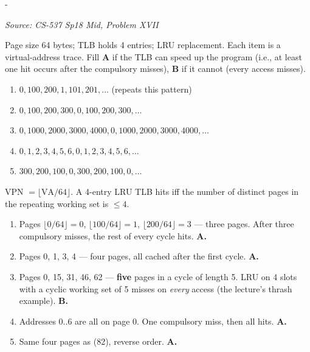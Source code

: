 \documentclass[11pt,a4paper]{article}
\makeatletter
\newcommand{\keepspace}[1]{\par\penalty-100\begingroup
  \setlength{\dimen@}{#1}\dimen@ii\pagegoal\advance\dimen@ii-\pagetotal
  \ifdim\dimen@>\dimen@ii\ifdim\dimen@ii>\z@\vfil\fi\break\fi\endgroup}
\newcounter{qn}[section]
\newenvironment{Qn}[4]{%
  \refstepcounter{qn}\keepspace{7\baselineskip}%
  \begin{tcolorbox}[qboxstyle, title={Q\thesection.\theqn\ \ [#1 \textbar\ #2]\ \ #4}]%
  {\footnotesize\color{g3}\textit{Source: #3}}\par\smallskip%
}{%
  \end{tcolorbox}%
}
\newenvironment{Sol}{%
  \begin{tcolorbox}[sboxstyle, title={Solution}]%
}{%
  \end{tcolorbox}\vspace{0.35em}%
}
\makeatother
\begin{document}
\begin{Qn}{Easy-Medium}{Lect 13}{CS-537 Sp18 Mid, Problem XVII}{Does a 4-entry LRU TLB help this address trace?}
Page size 64 bytes; TLB holds 4 entries; LRU replacement. Each item is a
virtual-address trace. Fill \textbf{A} if the TLB can speed up the
program (i.e., at least one hit occurs after the compulsory misses),
\textbf{B} if it cannot (every access misses).
\begin{enumerate}[(81)]
\item $0, 100, 200, 1, 101, 201, \ldots$ (repeats this pattern)
\item $0, 100, 200, 300, 0, 100, 200, 300, \ldots$
\item $0, 1000, 2000, 3000, 4000, 0, 1000, 2000, 3000, 4000, \ldots$
\item $0, 1, 2, 3, 4, 5, 6, 0, 1, 2, 3, 4, 5, 6, \ldots$
\item $300, 200, 100, 0, 300, 200, 100, 0, \ldots$
\end{enumerate}
\end{Qn}
\begin{Sol}
VPN $= \lfloor \mathrm{VA}/64\rfloor$. A 4-entry LRU TLB hits iff the
number of distinct pages in the repeating working set is $\le 4$.
\begin{enumerate}[(81)]
\item Pages $\lfloor 0/64\rfloor=0$, $\lfloor 100/64\rfloor=1$,
      $\lfloor 200/64\rfloor=3$ --- three pages. After three compulsory
      misses, the rest of every cycle hits. \textbf{A.}
\item Pages 0, 1, 3, 4 --- four pages, all cached after the first
      cycle. \textbf{A.}
\item Pages 0, 15, 31, 46, 62 --- \textbf{five} pages in a cycle of
      length 5. LRU on 4 slots with a cyclic working set of 5 misses
      on \emph{every} access (the lecture's thrash example). \textbf{B.}
\item Addresses $0..6$ are all on page 0. One compulsory miss, then
      all hits. \textbf{A.}
\item Same four pages as (82), reverse order. \textbf{A.}
\end{enumerate}
\end{Sol}
\end{document}
